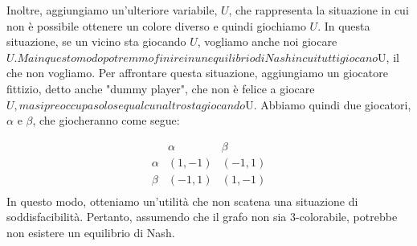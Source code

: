 Inoltre, aggiungiamo un'ulteriore variabile, $U$, che rappresenta la situazione
in cui non è possibile ottenere un colore diverso e quindi giochiamo $U$. In
questa situazione, se un vicino sta giocando $U$, vogliamo anche noi giocare
$U. Ma in questo modo potremmo finire in un equilibrio di Nash in cui tutti
    giocano $U, il che non vogliamo. Per affrontare questa situazione, aggiungiamo
un giocatore fittizio, detto anche "dummy player", che non è felice a giocare
$U, ma si preoccupa solo se qualcun altro sta giocando $U. Abbiamo quindi due
giocatori, $\alpha$ e $\beta$, che giocheranno come segue:

\[
    \begin{array}{ccc}
               & \alpha & \beta  \\
        \alpha & (1,-1) & (-1,1) \\
        \beta  & (-1,1) & (1,-1) \\
    \end{array}
\]
In questo modo, otteniamo un'utilità che non scatena una situazione di
soddisfacibilità. Pertanto, assumendo che il grafo non sia 3-colorabile,
potrebbe non esistere un equilibrio di Nash.

